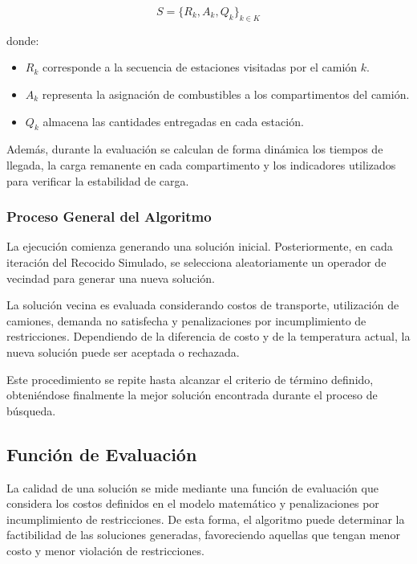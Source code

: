 \begin{equation}
S = \{R_k, A_k, Q_k\}_{k \in K}
\end{equation}

donde:

\begin{itemize}
\item $R_k$ corresponde a la secuencia de estaciones visitadas por el camión $k$.
\item $A_k$ representa la asignación de combustibles a los compartimentos del camión.
\item $Q_k$ almacena las cantidades entregadas en cada estación.
\end{itemize}

Además, durante la evaluación se calculan de forma dinámica los tiempos de llegada, la carga remanente en cada compartimento y los indicadores utilizados para verificar la estabilidad de carga.

\subsubsection{Proceso General del Algoritmo}

La ejecución comienza generando una solución inicial. Posteriormente, en cada iteración del Recocido Simulado, se selecciona aleatoriamente un operador de vecindad para generar una nueva solución.

La solución vecina es evaluada considerando costos de transporte, utilización de camiones, demanda no satisfecha y penalizaciones por incumplimiento de restricciones. Dependiendo de la diferencia de costo y de la temperatura actual, la nueva solución puede ser aceptada o rechazada.

Este procedimiento se repite hasta alcanzar el criterio de término definido, obteniéndose finalmente la mejor solución encontrada durante el proceso de búsqueda.

\subsection{Función de Evaluación}

La calidad de una solución se mide mediante una función de evaluación que considera los costos definidos en el modelo matemático y penalizaciones por incumplimiento de restricciones. De esta forma, el algoritmo puede determinar la factibilidad de las soluciones generadas, favoreciendo aquellas que tengan menor costo y menor violación de restricciones.

